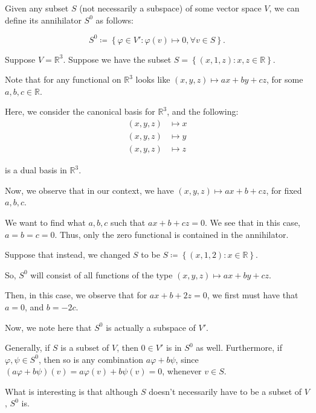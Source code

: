 \documentclass[openany]{book}
\newcommand{\RR}{\mathbb{R}}
\begin{document}
\begin{defn}[Annihilator]
	Given any subset $S$ (not necessarily a subspace) of some vector space $V$, we can define its annihilator $S^{0}$ as follows:
	
	\begin{equation*}
		S^{0} \coloneq \left\{  \varphi \in V' : \varphi(v) \mapsto 0, \forall v \in S \right\}.
	\end{equation*}
\end{defn}
\begin{example}
	Suppose $V = \RR^{3}$. Suppose we have the subset $S = \left\{  (x,1,z) : x, z \in \RR \right\}$.
	
	Note that for any functional on $\RR^{3}$ looks like $(x,y,z) \mapsto ax + by + cz$, for some $a,b,c \in \RR$. 
	
	Here, we consider the canonical basis for $\RR^{3}$, and the following:
	\begin{align*}
		(x,y,z) &\mapsto x \\
		(x,y,z) &\mapsto y \\
		(x,y,z) &\mapsto z 
	\end{align*}	

	is a dual basis in $\RR^{3}$.
	
	Now, we observe that in our context, we have $(x,y,z) \mapsto ax + b + cz$, for fixed $a,b,c$.
	
	We want to find what $a,b,c$ such that $ax + b + cz = 0$. We see that in this case, $a = b = c = 0$. Thus, only the zero functional is contained in the annihilator.
\end{example}
\begin{example}
	Suppose that instead, we changed $S$ to be $S \coloneq \left\{  (x,1,2):x\in \RR\right\}$.
	
	So, $S^{0}$ will consist of all functions of the type $(x,y,z) \mapsto ax+by+cz$.
	
	Then, in this case, we observe that for $ax + b + 2z = 0$, we first must have that $a = 0$, and $b = -2c$.
	
	Now, we note here that $S^{0}$ is actually a subspace of $V'$.
\end{example}

	Generally, if $S$ is a subset of $V$, then $0 \in V'$ is in $S^{0}$ as well. Furthermore, if $\varphi, \psi \in S^{0}$, then so is any combination $a\varphi + b\psi$, since $(a\varphi + b\psi)(v) = a\varphi(v) + b\psi(v) = 0$, whenever $v \in S$.
	
	What is interesting is that although $S$ doesn't necessarily have to be a subset of $V$, $S^{0}$ is. 
	
\end{document}
